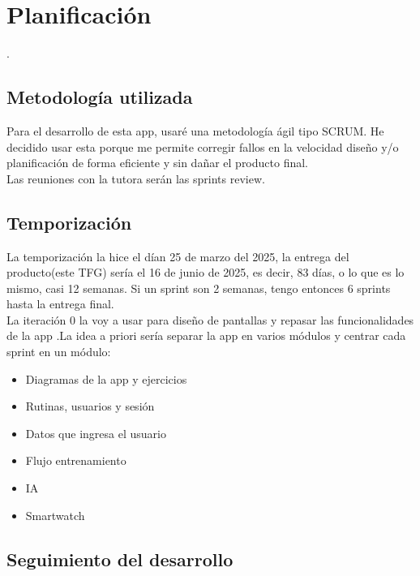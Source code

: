 \chapter{Planificación}
.
\section{Metodología utilizada}
Para el desarrollo de esta app, usaré una metodología ágil tipo SCRUM. He decidido usar esta porque me permite corregir fallos en la velocidad diseño y/o planificación de forma eficiente y sin dañar el producto final.\\

Las reuniones con la tutora serán las sprints review.
\section{Temporización}

La temporización la hice el dían 25 de marzo del 2025, la entrega del producto(este TFG) sería el 16 de junio de 2025,
es decir, 83 días, o lo que es lo mismo, casi 12 semanas. Si un sprint son 2 semanas, tengo entonces 6 sprints hasta la entrega final.\\
La iteración 0 la voy a usar para diseño de pantallas y repasar las funcionalidades de la app .La idea a priori sería separar la app en varios módulos y centrar cada sprint en un módulo:
\begin{itemize}
	\item Diagramas de la app y ejercicios
	\item Rutinas, usuarios y sesión
	\item Datos que ingresa el usuario
	\item Flujo entrenamiento
	\item IA
	\item Smartwatch
\end{itemize}

\section{Seguimiento del desarrollo}
